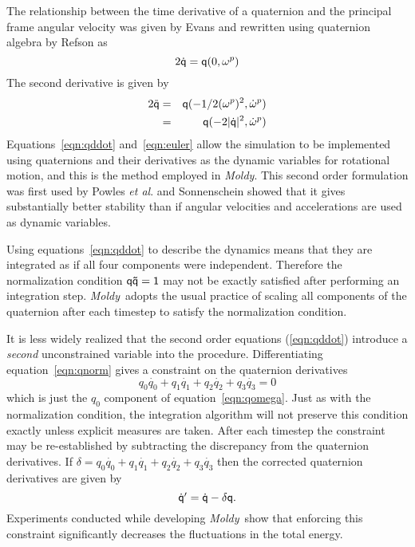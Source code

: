 \documentclass[a4paper,twoside]{report}
\providecommand{\bm}[1]{\mathbf{#1}}
\newcommand{\moldy}{\emph{Moldy}}
\begin{document}
The relationship between the time derivative of a quaternion and the
principal frame angular velocity was given by Evans\cite[Equation
27]{evans:77} and rewritten using quaternion algebra by 
Refson\cite{refson:87a} as
\begin{equation}
2 \Quat{\dot{q}} = \Quat{q}(0,\bm{\omega}^p)
\label{eqn:qomega}
\end{equation}
The second derivative is given by
\begin{eqnarray}
\nonumber
2\Quat{\ddot{q}} & = & \Quat{q}(- 1/2 (\omega^p)^2,\dot{\bm{\omega}}^p) \\
 & = & \Quat{q}(-2 |\Quat{\dot{q}}|^2,\dot{\bm{\omega}}^p)
\label{eqn:qddot}
\end{eqnarray}
Equations~\ref{eqn:qddot} and~\ref{eqn:euler} allow the simulation to
be implemented using quaternions and their derivatives as the dynamic
variables for rotational motion, and this is the method employed in
\moldy.  This second order formulation was first used by Powles \emph{et
al}.\cite{powles:79} and Sonnenschein showed\cite{sonnenschein:85}
that it gives substantially better stability than if angular
velocities and accelerations are used as dynamic variables.
 
Using equations~\ref{eqn:qddot} to describe the dynamics means that
they are integrated as if all four components were independent.
Therefore the normalization condition $\Quat{q \tilde{q}} = \Quat{1}$
may not be exactly satisfied after performing an integration step.
\moldy\ adopts the usual practice of scaling all components of the
quaternion after each timestep to satisfy the normalization
condition\cite{evans:77b}.

It is less widely realized that the second order equations
(\ref{eqn:qddot}) introduce a \emph{second} unconstrained variable
into the procedure.  Differentiating equation~\ref{eqn:qnorm} gives a
constraint on the quaternion derivatives
\begin{equation}
q_0\dot{q_0} + q_1\dot{q_1} + q_2\dot{q_2} + q_3\dot{q_3} = 0
\label{eqn:qconst} 
\end{equation}
which is just the $q_0$ component of equation~\ref{eqn:qomega}.
Just as with the normalization condition, the integration algorithm
will not preserve this condition exactly unless explicit measures are
taken.  After each timestep the constraint may be re-established by
subtracting the discrepancy from the quaternion derivatives.  If
$\delta = q_0\dot{q_0} + q_1\dot{q_1} + q_2\dot{q_2} + q_3\dot{q_3}$
then the corrected quaternion derivatives are given by
\begin{equation}
\Quat{\dot{q}^\prime } =  \Quat{\dot{q}} - \delta \Quat{q}.
\label{eqn:qconcorr}
\end{equation}
Experiments conducted while developing \moldy\ show that enforcing
this constraint significantly decreases the fluctuations in the total
energy. 
\end{document}
